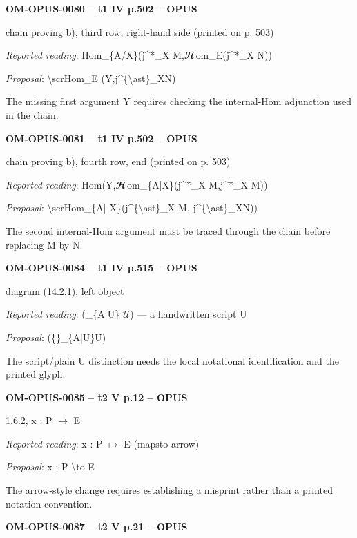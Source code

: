 \par\noindent\textbf{OM-OPUS-0080 -- t1 IV p.502 -- OPUS}\par
chain proving b), third row, right-hand side (printed on p. 503)\par
\emph{Reported reading}: Hom\_\{A/X\}(j\textasciicircum{}*\_X M,\ensuremath{𝓗}om\_E(j\textasciicircum{}*\_X N))\par
\emph{Proposal}: \textbackslash{}scrHom\_E (Y,j\textasciicircum{}\{\textbackslash{}ast\}\_XN)\par
The missing first argument Y requires checking the internal-Hom adjunction used in the chain.\par
\par\noindent\textbf{OM-OPUS-0081 -- t1 IV p.502 -- OPUS}\par
chain proving b), fourth row, end (printed on p. 503)\par
\emph{Reported reading}: Hom(Y,\ensuremath{𝓗}om\_\{A|X\}(j\textasciicircum{}*\_X M,j\textasciicircum{}*\_X M))\par
\emph{Proposal}: \textbackslash{}scrHom\_\{A| X\}(j\textasciicircum{}\{\textbackslash{}ast\}\_X M, j\textasciicircum{}\{\textbackslash{}ast\}\_XN))\par
The second internal-Hom argument must be traced through the chain before replacing M by N.\par
\par\noindent\textbf{OM-OPUS-0084 -- t1 IV p.515 -- OPUS}\par
diagram (14.2.1), left object\par
\emph{Reported reading}: (\_\{A|U\} \ensuremath{𝒰}) — a handwritten script U\par
\emph{Proposal}: (\{\}\_\{A|U\}U)\par
The script/plain U distinction needs the local notational identification and the printed glyph.\par
\par\noindent\textbf{OM-OPUS-0085 -- t2 V p.12 -- OPUS}\par
1.6.2, x : P \ensuremath{\to} E\par
\emph{Reported reading}: x : P \ensuremath{\longmapsto} E (mapsto arrow)\par
\emph{Proposal}: x : P \textbackslash{}to E\par
The arrow-style change requires establishing a misprint rather than a printed notation convention.\par
\par\noindent\textbf{OM-OPUS-0087 -- t2 V p.21 -- OPUS}\par
